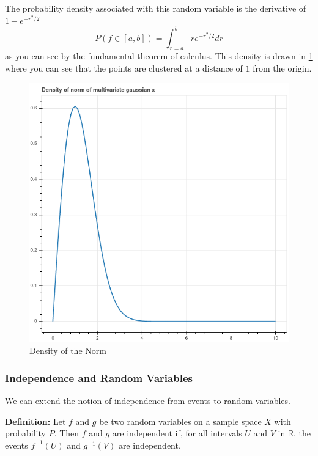\documentclass[
]{article}
\begin{document}
The probability density associated with this random variable is the
derivative of \(1-e^{-r^2/2}\) \[
P(f\in [a,b])=\int_{r=a}^{b} re^{-r^2/2} dr
\] as you can see by the fundamental theorem of calculus. This density
is drawn in \cref{fig:maxwell} where you can see that the points are
clustered at a distance of \(1\) from the origin.

\begin{figure}
\hypertarget{fig:maxwell}{%
\centering
\includegraphics{../img/maxwell.png}
\caption{Density of the Norm}\label{fig:maxwell}
}
\end{figure}

\hypertarget{independence-and-random-variables}{%
\subsubsection{Independence and Random
Variables}\label{independence-and-random-variables}}

We can extend the notion of independence from events to random
variables.

\textbf{Definition:} Let \(f\) and \(g\) be two random variables on a
sample space \(X\) with probability \(P\). Then \(f\) and \(g\) are
independent if, for all intervals \(U\) and \(V\) in \(\mathbb{R}\), the
events \(f^{-1}(U)\) and \(g^{-1}(V)\) are independent.
\end{document}

